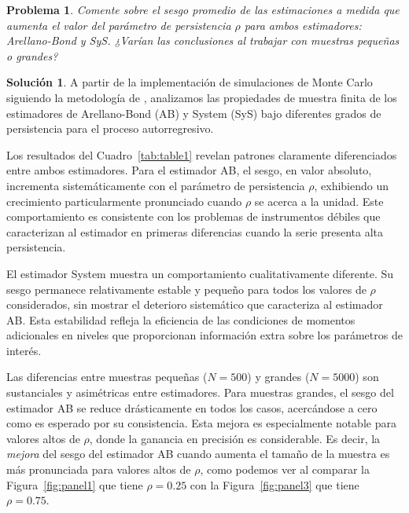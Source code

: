 \documentclass[12pt,letterpaper,reqno,oneside]{amsart}
\theoremstyle{problemstyle} %
\newtheorem{problem}{Problema}
\theoremstyle{definition} %
\newtheorem{solution}{Solución}[problem]
\renewcommand{\thesolution}{\theproblem~(\alph{solution})}
\begin{document}
\endgroup
\begin{mdframed}
  \begin{problem}
  \label{prob:3}
  Comente sobre el sesgo promedio de las estimaciones a medida que aumenta el valor del parámetro de persistencia $\rho$ para ambos estimadores: Arellano-Bond y SyS. ¿Varían las conclusiones al trabajar con muestras pequeñas o grandes?
  \end{problem}
\end{mdframed}
\begingroup
\renewcommand{\thesolution}{\theproblem}
\begin{solution} %
  \label{sol:3}
  A partir de la implementación de simulaciones de Monte Carlo siguiendo la metodología de \textcite{al-sadoonSimpleMethodsConsistent2019}, analizamos las propiedades de muestra finita de los estimadores de Arellano-Bond (AB) y System (SyS) bajo diferentes grados de persistencia para el proceso autorregresivo.

  Los resultados del Cuadro~\ref{tab:table1} revelan patrones claramente diferenciados entre ambos estimadores.
  Para el estimador AB, el sesgo, en valor absoluto, incrementa sistemáticamente con el parámetro de persistencia $\rho$, exhibiendo un crecimiento particularmente pronunciado cuando $\rho$ se acerca a la unidad.
  Este comportamiento es consistente con los problemas de instrumentos débiles que caracterizan al estimador en primeras diferencias cuando la serie presenta alta persistencia.

  El estimador System muestra un comportamiento cualitativamente diferente.
  Su sesgo permanece relativamente estable y pequeño para todos los valores de $\rho$ considerados, sin mostrar el deterioro sistemático que caracteriza al estimador AB.
  Esta estabilidad refleja la eficiencia de las condiciones de momentos adicionales en niveles que proporcionan información extra sobre los parámetros de interés.

  Las diferencias entre muestras pequeñas ($N = 500$) y grandes ($N = 5000$) son sustanciales y asimétricas entre estimadores.
  Para muestras grandes, el sesgo del estimador AB se reduce drásticamente en todos los casos, acercándose a cero como es esperado por su consistencia.
  Esta mejora es especialmente notable para valores altos de $\rho$, donde la ganancia en precisión es considerable.
  Es decir, la \emph{mejora} del sesgo del estimador AB cuando aumenta el tamaño de la muestra es más pronunciada para valores altos de $\rho$, como podemos ver al comparar la Figura~\ref{fig:panel1} que tiene $\rho = 0.25$ con la Figura~\ref{fig:panel3} que tiene $\rho = 0.75$.


\end{solution}
\end{document}
